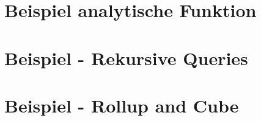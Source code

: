 \section{Beispiel analytische Funktion}

\section{Beispiel - Rekursive Queries}

\section{Beispiel - Rollup and Cube}